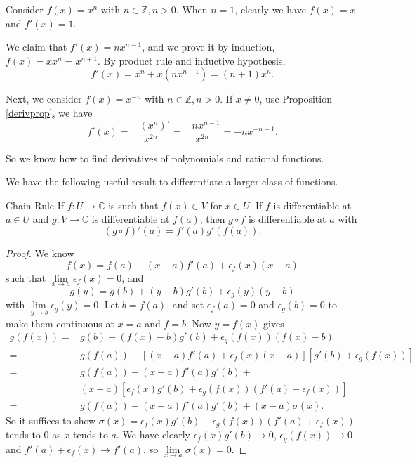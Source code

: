 \begin{example}
    Consider \(f(x) = x^{n}\) with \(n \in \mathbb{Z}, n>0\). When \(n = 1\), clearly we have \(f(x) = x\) and \(f'(x) = 1\).

    We claim that \(f'(x) = nx^{n-1}\), and we prove it by induction, \(f(x) = x x^n = x^{n + 1}\). By product rule and inductive hypothesis,
    \[
        f'(x) = x^n + x(nx^{n-1}) = (n + 1) x^n.
    \]

    Next, we consider \(f(x) = x^{-n}\) with \(n \in \mathbb{Z}, n > 0\). If \(x \neq 0\), use Proposition \eqref{derivprop}, we have
    \[
        f'(x) = \frac{-(x^n)'}{x^{2n}} = \frac{-nx^{n-1}}{x^{2n}} = -n x^{-n -1}.
    \]

    So we know how to find derivatives of polynomials and rational functions.
\end{example}
We have the following useful result to differentiate a larger class of functions.
\begin{theorem}{Chain Rule}{}
    If \(f: U \to \mathbb{C}\) is such that \(f(x) \in V\) for \(x \in U\). If \(f\) is differentiable at \(a \in U\) and \(g:V \to \mathbb{C}\) is differentiable at \(f(a)\), then \(g\circ f\) is differentiable at \(a\) with
    \[
        (g\circ f)'(a) = f'(a)g'(f(a)).
    \]
\end{theorem}
\begin{proof}
    We know
    \[
        f(x) = f(a) + (x-a)f'(a) + \epsilon_f(x)(x-a)
    \]
    such that \(\lim\limits_{x \to a} \epsilon_f(x)= 0\), and
    \[
        g(y) = g(b) + (y - b)g'(b) + \epsilon_g(y)(y-b)
    \]
    with \(\lim\limits_{y \to b} \epsilon_g(y) = 0\). Let \(b = f(a)\), and set \(\epsilon_f(a) = 0\) and \(\epsilon_g(b) = 0\) to make them continuous at \(x = a\) and \(f = b\). Now \(y = f(x)\) gives
    \begin{align*}
        g(f(x)) =& g(b) + (f(x) - b)g'(b) + \epsilon_g(f(x))(f(x) - b)\\
        =&g(f(a)) + [(x-a)f'(a) + \epsilon_f(x)(x-a)][g'(b) + \epsilon_g(f(x))]\\
        =& g(f(a)) + (x-a)f'(a)g'(b) +\\
        &(x-a)[\epsilon_f(x)g'(b) + \epsilon_g(f(x))(f'(a) + \epsilon_f(x))]\\
        =& g(f(a)) + (x-a)f'(a)g'(b) + (x-a)\sigma(x).
    \end{align*}
    So it suffices to show \(\sigma(x) = \epsilon_f(x)g'(b) + \epsilon_g(f(x))(f'(a) + \epsilon_f(x))\) tends to 0 as \(x\) tends to \(a\). We have clearly \(\epsilon_f(x)g'(b) \to 0\), \(\epsilon_g(f(x)) \to 0\) and \(f'(a)+\epsilon_f(x) \to f'(a)\), so \(\lim\limits_{x \to a} \sigma(x) = 0\).
\end{proof}

